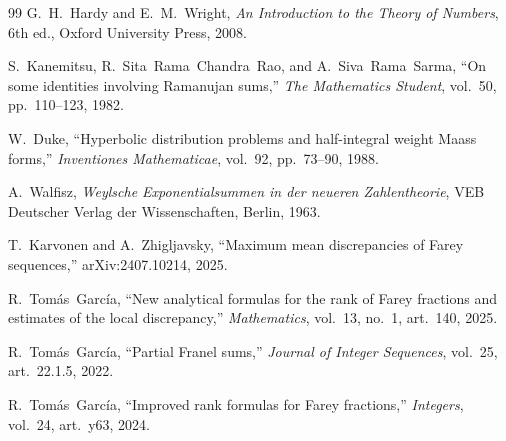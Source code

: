 \documentclass[11pt]{article}
\theoremstyle{definition}
\begin{document}
\begin{thebibliography}{99}
G.~H.~Hardy and E.~M.~Wright,
\emph{An Introduction to the Theory of Numbers}, 6th ed.,
Oxford University Press, 2008.

S.~Kanemitsu, R.~Sita~Rama~Chandra~Rao, and A.~Siva~Rama~Sarma,
``On some identities involving Ramanujan sums,''
\emph{The Mathematics Student}, vol.~50, pp.~110--123, 1982.

W.~Duke,
``Hyperbolic distribution problems and half-integral weight Maass forms,''
\emph{Inventiones Mathematicae}, vol.~92, pp.~73--90, 1988.

A.~Walfisz,
\emph{Weylsche Exponentialsummen in der neueren Zahlentheorie},
VEB Deutscher Verlag der Wissenschaften, Berlin, 1963.

T.~Karvonen and A.~Zhigljavsky,
``Maximum mean discrepancies of Farey sequences,''
arXiv:2407.10214, 2025.

R.~Tom\'as~Garc\'ia,
``New analytical formulas for the rank of Farey fractions and
estimates of the local discrepancy,''
\emph{Mathematics}, vol.~13, no.~1, art.~140, 2025.

R.~Tom\'as~Garc\'ia,
``Partial Franel sums,''
\emph{Journal of Integer Sequences}, vol.~25, art.~22.1.5, 2022.

R.~Tom\'as~Garc\'ia,
``Improved rank formulas for Farey fractions,''
\emph{Integers}, vol.~24, art.~y63, 2024.

\end{thebibliography}
\end{document}
